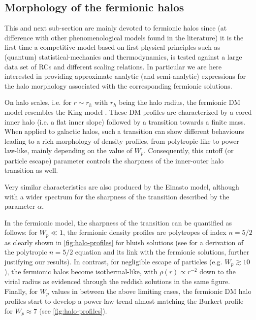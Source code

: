 \subsection{Morphology of the fermionic halos}
\label{sec:morph}

This and next sub-section are mainly devoted to fermionic halos since (at difference with other phenomenological models found in the literature) it is the first time a competitive model based on first physical principles such as (quantum) statistical-mechanics and thermodynamics, is tested against a large data set of RCs and different scaling relations. In particular we are here interested in providing approximate analytic (and semi-analytic) expressions for the halo morphology associated with the corresponding fermionic solutions.

On halo scales, i.e. for $r \sim r_h$ with $r_h$ being the halo radius, the fermionic DM model resembles the King model \citep{1966AJ.....71...64K}. These DM profiles are characterized by a cored inner halo (i.e. a flat inner slope) followed by a transition towards a finite mass. When applied to galactic halos, such a transition can show different behaviours leading to a rich morphology of density profiles, from polytropic-like to power law-like, mainly depending on the value of $W_p$. Consequently, this cutoff (or particle escape) parameter controls the sharpness of the inner-outer halo transition as well.

Very similar characteristics are also produced by the Einasto model, although with a wider spectrum for the sharpness of the transition described by the parameter $\alpha$.

In the fermionic model, the sharpness of the transition can be quantified as follows: for $W_p\ll 1$, the fermionic density profiles are polytropes of index $n=5/2$ as clearly shown in \cref{fig:halo-profiles} for bluish solutions (see \citealp{2015PhRvD..92l3527C} for a derivation of the polytropic $n=5/2$ equation and its link with the fermionic solutions, further justifying our results). In contrast, for negligible escape of particles (e.g. $W_p \gtrsim 10$), the fermionic halos become isothermal-like, with $\rho(r) \propto r^{-2}$ down to the virial radius as evidenced through the reddish solutions in the same figure. Finally, for $W_p$ values in between the above limiting cases, the fermionic DM halo profiles start to develop a power-law trend almost matching the Burkert profile for $W_p\approx 7$ (see \cref{fig:halo-profiles}).

